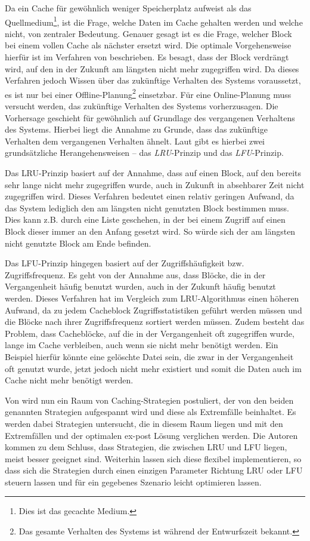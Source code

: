 Da ein Cache für gewöhnlich weniger Speicherplatz aufweist als das Quellmedium\footnote{Dies ist das gecachte Medium.}, ist die Frage, welche Daten im Cache
gehalten werden und welche nicht, von zentraler Bedeutung. Genauer gesagt ist es die Frage, welcher Block bei einem vollen Cache als nächster ersetzt wird. Die
optimale Vorgehensweise hierfür ist im Verfahren von \textcite{cache1} beschrieben. Es besagt, dass der Block verdrängt wird, auf den in der Zukunft am
längsten nicht mehr zugegriffen wird. Da dieses Verfahren jedoch Wissen über das zukünftige Verhalten des Systems voraussetzt, es ist nur bei einer
Offline-Planung\footnote{Das gesamte Verhalten des Systems ist während der Entwurfszeit bekannt.}  einsetzbar. Für eine Online-Planung muss versucht werden, das
zukünftige Verhalten des Systems vorherzusagen. Die Vorhersage geschieht für gewöhnlich auf Grundlage des vergangenen Verhaltens des Systems. Hierbei liegt die
Annahme zu Grunde, dass das zukünftige Verhalten dem vergangenen Verhalten ähnelt. Laut \textcite{cache2} gibt es hierbei zwei grundsätzliche Herangehensweisen --
das \textit{\ac{LRU}}-Prinzip und das \textit{\ac{LFU}}-Prinzip.

Das \ac{LRU}-Prinzip basiert auf der Annahme, dass auf einen Block, auf den bereits sehr lange nicht mehr zugegriffen wurde, auch in Zukunft in absehbarer Zeit
nicht zugegriffen wird. Dieses Verfahren bedeutet einen relativ geringen Aufwand, da das System lediglich den am längsten nicht genutzten Block bestimmen muss.
Dies kann z.B. durch eine Liste geschehen, in der bei einem Zugriff auf einen Block dieser immer an den Anfang gesetzt wird. So würde sich der am längsten nicht
genutzte Block am Ende befinden.

Das \ac{LFU}-Prinzip hingegen basiert auf der Zugriffshäufigkeit bzw. Zugriffsfrequenz. Es geht von der Annahme aus, dass Blöcke, die in der Vergangenheit häufig
benutzt wurden, auch in der Zukunft häufig benutzt werden. Dieses Verfahren hat im Vergleich zum \ac{LRU}-Algorithmus einen höheren Aufwand, da zu jedem
Cacheblock Zugriffsstatistiken geführt werden müssen und die Blöcke nach ihrer Zugriffsfrequenz sortiert werden müssen. Zudem besteht das Problem, dass
Cacheblöcke, auf die in der Vergangenheit oft zugegriffen wurde, lange im Cache verbleiben, auch wenn sie nicht mehr benötigt werden. Ein Beispiel hierfür könnte
eine gelöschte Datei sein, die zwar in der Vergangenheit oft genutzt wurde, jetzt jedoch nicht mehr existiert und somit die Daten auch im Cache nicht mehr
benötigt werden.

Von \citeauthor{cache2} wird nun ein Raum von Caching-Strategien postuliert, der von den beiden genannten Strategien aufgespannt wird und diese als Extremfälle
beinhaltet. Es werden dabei Strategien untersucht, die in diesem Raum liegen und mit den Extremfällen und der optimalen ex-post Lösung verglichen werden. Die
Autoren kommen zu dem Schluss, dass Strategien, die zwischen \ac{LRU} und \ac{LFU} liegen, meist besser geeignet sind. Weiterhin lassen sich diese flexibel
implementieren, so dass sich die Strategien durch einen einzigen Parameter Richtung \ac{LRU} oder \ac{LFU} steuern lassen und für ein gegebenes Szenario leicht
optimieren lassen.
